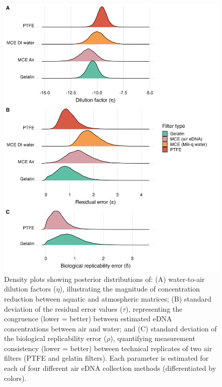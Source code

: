 \documentclass{article}
\begin{document}
\begin{figure}[tbhp] 
\centering
\includegraphics[width=15.5cm]{Plots/Figure_2.jpg}  
\caption{Density plots showing posterior distributions of: (A) water-to-air dilution factors ($\eta$), illustrating the magnitude of concentration reduction between aquatic and atmospheric matrices; (B) standard deviation of the residual error values ($\tau$), representing the congruence (lower = better) between estimated eDNA concentrations between air and water; and (C) standard deviation of the biological replicability error ($\rho$), quantifying measurement consistency (lower = better) between technical replicates of two air filters (PTFE and gelatin filters). Each parameter is estimated for each of four different air eDNA collection methods (differentiated by colors).}
\label{fig:fig2}
\end{figure}

\end{document}
